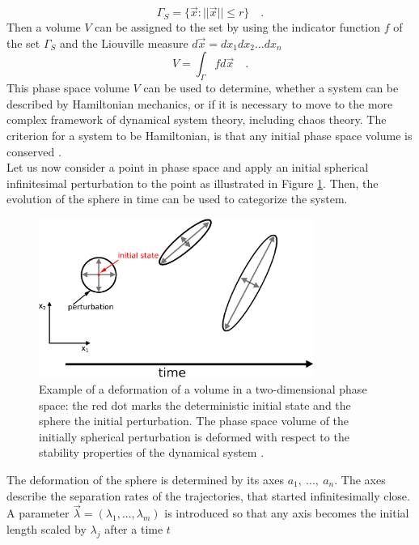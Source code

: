 \begin{equation}
    \Gamma_{S} = \{ \vec{x}:|| \vec{x}||\leq r \} \quad .
\end{equation}
Then a volume $V$ can be assigned to the set by using the indicator function $f$ of the set $\Gamma_{S}$ and the Liouville measure $d\vec{x}=dx_{1}dx_{2}...dx_{n}$
\begin{equation}
    V = \int_\Gamma f d\vec{x} \quad .
    \label{eq:volps}
\end{equation}
This phase space volume $V$ can be used to determine, whether a system can be described by Hamiltonian mechanics, or if it is necessary to move to the more complex framework of dynamical system theory, including chaos theory.
The criterion for a system to be Hamiltonian, is that any initial phase space volume is conserved \cite{knauf2018linear}. \\
Let us now consider a point in phase space and apply an initial spherical infinitesimal perturbation to the point as illustrated in Figure \ref{fig:phasespace}. Then, the evolution of the sphere in time can be used to categorize the system. 
\begin{figure}[h]
      \captionsetup{width=.8\linewidth}
    \centering
    \includegraphics[width=0.8\textwidth]{graphics/phasespace_deform.eps}
    \caption[Deformation of Phase Space Volume]{Example of a deformation of a volume in a two-dimensional phase space: the red dot marks the deterministic initial state and the sphere the initial perturbation. The phase space volume of  the initially spherical perturbation is deformed with respect to the stability properties of the dynamical system \cite{kalnay2003atmospheric}.}
    \label{fig:phasespace}
\end{figure}
The deformation of the sphere is determined by its axes $a_{1}, \  ..., \ a_{n}$. The axes describe the separation rates of the trajectories, that started infinitesimally close. A parameter $\vec{\lambda} = (\lambda_{1},  ... ,\lambda_{m})$ is introduced so that any axis becomes the initial length scaled by $\lambda_{j}$ after a time $t$

